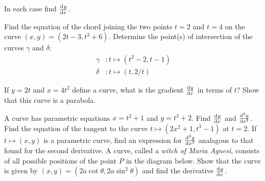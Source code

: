 \begin{questions}
  \questioM In each case find $ \od{y}{x} $.
  \questioA Find the equation of the chord joining the two points $ t = 2 $ and $ t = 4 $ on the
            curve $ (x,y) = (2t - 3, t^3 + 6) $.
  \questioM Determine the point(s) of intersection of the curves $ \gamma $ and $ \delta $:
            \begin{align*}
              \gamma &: t \mapsto (t^2 - 2, t - 1)\\
              \delta &: t \mapsto (t, 2/t)
            \end{align*}
  \question
    \begin{parts}
      \parM If $ y = 2t $ and $ x = 4t^2 $ define a curve, what is the gradient $ \od{y}{x} $ in terms of $ t $?
      \parE Show that this curve is a parabola.
    \end{parts}
  \questioM A curve has parametric equations $ x = t^2 + 1 $ and $ y = t^3 + 2 $. Find $ \od{y}{x} $ and $ \od[2]{y}{x} $.
  \questioM Find the equation of the tangent to the curve $ t \mapsto (2x^2 + 1, t^3 - 1) $ at $ t = 2 $.
  \questioE If $ t \mapsto (x, y) $ is a parametric curve, find an expression for $ \od[3]{y}{x} $ analagous to that found for
            the second derivative.
  \questioS A curve, called a \textit{witch of Maria Agnesi}, consists of all possible positions of the point $ P $ in
            the diagram below. Show that the curve is given by $ (x, y) = (2a \cot \theta, 2a \sin^2 \theta) $ and
            find the derivative $ \od{y}{x} $.
            \begin{center}

\end{center}
\end{questions}
